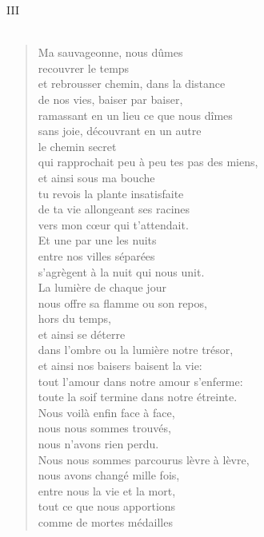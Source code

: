 \documentclass[11pt,a4paper]{book}
\begin{document}
\newpage

{\huge III} \\ \\

\begin{verse}
Ma sauvageonne, nous dûmes \\
recouvrer le temps \\
et rebrousser chemin, dans la distance \\
de nos vies, baiser par baiser, \\
ramassant en un lieu ce que nous dîmes \\
sans joie, découvrant en un autre \\
le chemin secret \\
qui rapprochait peu à peu tes pas des miens, \\
et ainsi sous ma bouche \\
tu revois la plante insatisfaite \\
de ta vie allongeant ses racines \\
vers mon c{\oe}ur qui t'attendait. \\
Et une par une les nuits \\
entre nos villes séparées \\
s'agrègent à la nuit qui nous unit. \\
La lumière de chaque jour \\
nous offre sa flamme ou son repos, \\
hors du temps, \\
et ainsi se déterre \\
dans l'ombre ou la lumière notre trésor, \\
et ainsi nos baisers baisent la vie: \\
tout l'amour dans notre amour s'enferme: \\
toute la soif termine dans notre étreinte. \\
Nous voilà enfin face à face, \\
nous nous sommes trouvés, \\
nous n'avons rien perdu. \\
Nous nous sommes parcourus lèvre à lèvre, \\
nous avons changé mille fois, \\
entre nous la vie et la mort, \\
tout ce que nous apportions \\
comme de mortes médailles \\

\end{verse}
\end{document}
